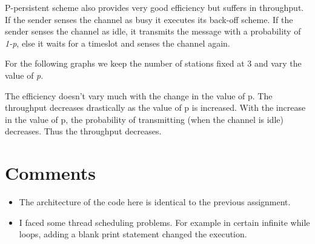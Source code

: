 \documentclass[14pt,titlepage, a4paper]{extarticle}
\begin{document}
P-persistent scheme also provides very good efficiency but suffers in throughput.
If the sender senses the channel as busy it executes its back-off scheme.
If the sender senses the channel as idle, it transmits the message with a
probability of \emph{1-p}, else it waits for a timeslot and senses the channel again.
\par
For the following graphs we keep the number of stations fixed at 3 and
vary the value of \emph{p}.
\\
\null
{}

The efficiency doesn't vary much with the change in the value of p.
The throughput decreases drastically as the value of p is increased.
With the increase in the value of p, the probability of transmitting 
(when the channel is idle) decreases. Thus the throughput decreases.

\pagebreak
\section{Comments}
\begin{itemize}
		\item The architecture of the code here is identical 
			to the previous assignment. 
		\item I faced some thread scheduling problems.
			For example in certain infinite while loops, adding a blank print statement
			changed the execution.
\end{itemize}
\end{document}

